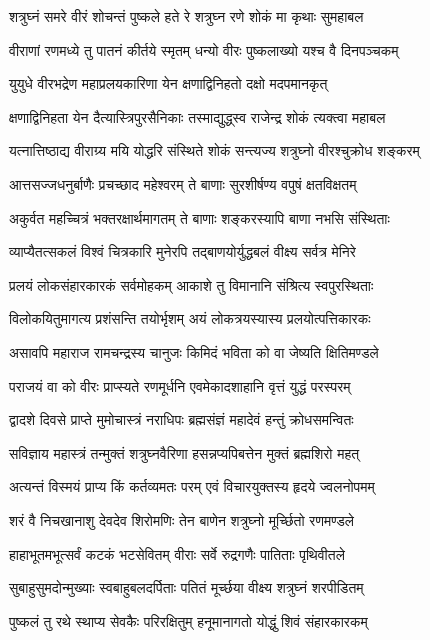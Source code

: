 \twolineshloka
{शत्रुघ्नं समरे वीरं शोचन्तं पुष्कले हते}
{रे शत्रुघ्न रणे शोकं मा कृथाः सुमहाबल}%

\twolineshloka
{वीराणां रणमध्ये तु पातनं कीर्तये स्मृतम्}
{धन्यो वीरः पुष्कलाख्यो यश्च वै दिनपञ्चकम्}%

\twolineshloka
{युयुधे वीरभद्रेण महाप्रलयकारिणा}
{येन क्षणाद्विनिहतो दक्षो मदपमानकृत्}%

\twolineshloka
{क्षणाद्विनिहता येन दैत्यास्त्रिपुरसैनिकाः}
{तस्माद्युद्ध्स्व राजेन्द्र शोकं त्यक्त्वा महाबल}%

\twolineshloka
{यत्नात्तिष्ठाद्य वीराग्र्य मयि योद्धरि संस्थिते}
{शोकं सन्त्यज्य शत्रुघ्नो वीरश्चुक्रोध शङ्करम्}%

\twolineshloka
{आत्तसज्जधनुर्बाणैः प्रचच्छाद महेश्वरम्}
{ते बाणाः सुरशीर्षण्य वपुषं क्षतविक्षतम्}%

\twolineshloka
{अकुर्वत महच्चित्रं भक्तरक्षार्थमागतम्}
{ते बाणाः शङ्करस्यापि बाणा नभसि संस्थिताः}%

\twolineshloka
{व्याप्यैतत्सकलं विश्वं चित्रकारि मुनेरपि}
{तद्बाणयोर्युद्धबलं वीक्ष्य सर्वत्र मेनिरे}%

\twolineshloka
{प्रलयं लोकसंहारकारकं सर्वमोहकम्}
{आकाशे तु विमानानि संश्रित्य स्वपुरस्थिताः}%

\twolineshloka
{विलोकयितुमागत्य प्रशंसन्ति तयोर्भृशम्}
{अयं लोकत्रयस्यास्य प्रलयोत्पत्तिकारकः}%

\twolineshloka
{असावपि महाराज रामचन्द्रस्य चानुजः}
{किमिदं भविता को वा जेष्यति क्षितिमण्डले}%

\twolineshloka
{पराजयं वा को वीरः प्राप्स्यते रणमूर्धनि}
{एवमेकादशाहानि वृत्तं युद्धं परस्परम्}%

\twolineshloka
{द्वादशे दिवसे प्राप्ते मुमोचास्त्रं नराधिपः}
{ब्रह्मसंज्ञं महादेवं हन्तुं क्रोधसमन्वितः}%

\twolineshloka
{सविज्ञाय महास्त्रं तन्मुक्तं शत्रुघ्नवैरिणा}
{हसन्नप्यपिबत्तेन मुक्तं ब्रह्मशिरो महत्}%

\twolineshloka
{अत्यन्तं विस्मयं प्राप्य किं कर्तव्यमतः परम्}
{एवं विचारयुक्तस्य हृदये ज्वलनोपमम्}%

\twolineshloka
{शरं वै निचखानाशु देवदेव शिरोमणिः}
{तेन बाणेन शत्रुघ्नो मूर्च्छितो रणमण्डले}%

\twolineshloka
{हाहाभूतमभूत्सर्वं कटकं भटसेवितम्}
{वीराः सर्वे रुद्रगणैः पातिताः पृथिवीतले}%

\twolineshloka
{सुबाहुसुमदोन्मुख्याः स्वबाहुबलदर्पिताः}
{पतितं मूर्च्छया वीक्ष्य शत्रुघ्नं शरपीडितम्}%

\twolineshloka
{पुष्कलं तु रथे स्थाप्य सेवकैः परिरक्षितुम्}
{हनूमानागतो योद्धुं शिवं संहारकारकम्}%

